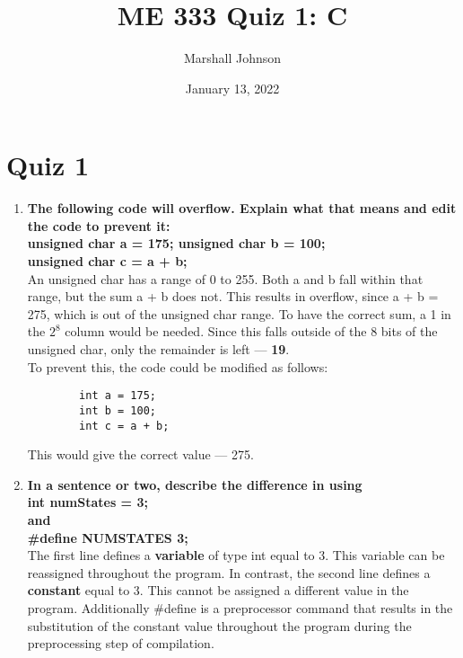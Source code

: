 \documentclass{article}
\title{ME 333 Quiz 1: C}
\author{Marshall Johnson}
\date{January 13, 2022}
\begin{document}
\maketitle

\section*{Quiz 1}

\begin{enumerate}[label=\textbf{\arabic*})]
    \item \textbf{The following code will overflow. Explain what that means and edit the code to prevent it: \\
    unsigned char a = 175; unsigned char b = 100; \\ unsigned char c = a + b;} \\

    An unsigned char has a range of 0 to 255. Both a and b fall within that range, but the sum a + b does not.
    This results in overflow, since a + b = 275, which is out of the unsigned char range. To have the correct
    sum, a 1 in the $2^8$ column would be needed. Since this falls outside of the 8 bits of the unsigned char, 
    only the remainder is left --- \textbf{19}. \\

    To prevent this, the code could be modified as follows: \\

    \begin{lstlisting}
        int a = 175;
        int b = 100;
        int c = a + b;
    \end{lstlisting}

    This would give the correct value --- 275.

    \item \textbf{In a sentence or two, describe the difference in using \\ 
    int numStates = 3; \\
    and \\
    \#define NUMSTATES 3;} \\

    The first line defines a \textbf{variable} of type int equal to 3. This variable can be
    reassigned throughout the program. In contrast, the second line defines a 
    \textbf{constant} equal to 3. This cannot be assigned a different value in the program. 
    Additionally \#define is a preprocessor command that results in the substitution
    of the constant value throughout the program during the preprocessing step of 
    compilation. 


\end{enumerate}
\end{document}
